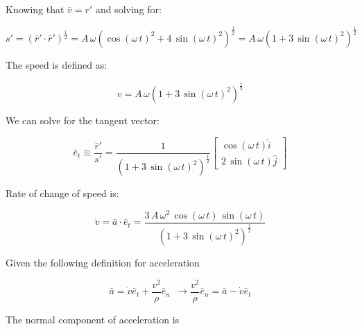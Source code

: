 \documentclass[12pt, letterpaper]{../assignment}
\begin{document}
Knowing that $\bar{v} = r'$ and solving for:

$$ s' = \left( \bar{r}' \cdot \bar{r}' \right)^\frac{1}{2} = A\,\omega \left( {\cos\left(\omega \,t\right)}^2+4\,{\sin\left(\omega \,t\right)}^2 \right)^\frac{1}{2}
= A\,\omega \left( 1+3\,{\sin\left(\omega \,t\right)}^2 \right)^\frac{1}{2}$$

The speed is defined as:

\begin{answer}
$$ v = A\,\omega \left( 1+3\,{\sin\left(\omega \,t\right)}^2 \right)^\frac{1}{2} $$
\end{answer}

We can solve for the tangent vector:

$$ \bar{e}_t  \equiv \frac{\bar{r}'}{s'} = \frac{1}{{\left(1+ 3\,{\sin\left(\omega \,t\right)}^2\right)}^\frac{1}{2}}
\left[\begin{array}{c} {\cos\left(\omega \,t\right)} \hat{i}\\ {2\,\sin\left(\omega \,t\right)}\hat{j} \end{array}\right]$$

Rate of change of speed is:

\begin{answer}
$$ \dot{v} = \bar{a} \cdot \bar{e}_t =
\frac{3\,A\,\omega ^2\,\cos\left(\omega \,t\right)\,\sin\left(\omega \,t\right)}{{\left(1+ 3\,{\sin\left(\omega \,t\right)}^2\right)}^\frac{1}{2}}$$
\end{answer}

Given the following definition for acceleration

$$ \bar{a} = \dot{v} \bar{e}_t + \frac{v^2}{\rho}\bar{e}_n \ \ \rightarrow  \frac{v^2}{\rho}\bar{e}_n = \bar{a} - \dot{v} \bar{e}_t  $$

The normal component of acceleration is 
\end{document}
